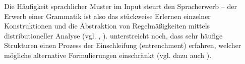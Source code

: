 Die Häufigkeit sprachlicher Muster im Input steurt den Spracherwerb -- der Erwerb einer Grammatik ist also das stückweise Erlernen einzelner Konstruktionen und die Abstraktion von Regelmäßigkeiten mittels distributioneller Analyse (vgl. \cite{Ellis08}, \cite{Bybee06}).
\cite{Bybee06} unterstreicht noch, dass sehr häufige Strukturen einen Prozess der Einschleifung (entrenchment) erfahren, welcher mögliche alternative Formulierungen einschränkt (vgl. dazu auch \cite{Tomasello06}).










